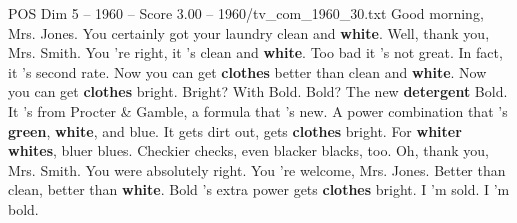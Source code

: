 \begin{textsample}{POS Dim 5 – 1960 – Score 3.00 – 1960/tv\_com\_1960\_30.txt}  \label{ex:f5_pos_083}
Good morning, Mrs.
Jones.
You certainly got your laundry clean and \textbf{white}.
Well, thank you, Mrs.
Smith.
You 're right, it 's clean and \textbf{white}.
Too bad it 's not great.
In fact, it 's second rate.
Now you can get \textbf{clothes} better than clean and \textbf{white}.
Now you can get \textbf{clothes} bright.
Bright?
With Bold.
Bold?
The new \textbf{detergent} Bold.
It 's from Procter \& Gamble, a formula that 's new.
A power combination that 's \textbf{green}, \textbf{white}, and blue.
It gets dirt out, gets \textbf{clothes} bright.
For \textbf{whiter} \textbf{whites}, bluer blues.
Checkier checks, even blacker blacks, too.
Oh, thank you, Mrs.
Smith.
You were absolutely right.
You 're welcome, Mrs.
Jones.
Better than clean, better than \textbf{white}.
Bold 's extra power gets \textbf{clothes} bright.
I 'm sold.
I 'm bold.

\end{textsample}
